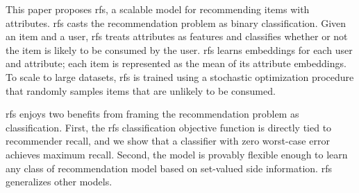 







This paper proposes \gls{rfs}, a scalable model for recommending items with
attributes. \gls{rfs} casts the recommendation problem as binary classification.
Given an item and a user, \gls{rfs} treats attributes as features and classifies
whether or not the item is likely to be consumed by the user. \gls{rfs} learns
embeddings for each user and attribute; each item is represented as the mean of
its attribute embeddings. To scale to large datasets, \gls{rfs} is trained using
a stochastic optimization procedure that randomly samples items that are
unlikely to be consumed.

\gls{rfs} enjoys two benefits from framing the recommendation problem as
classification. First, the \gls{rfs} classification objective function is
directly tied to recommender recall, and we show that a classifier with zero
worst-case error achieves maximum recall. Second, the model is provably flexible
enough to learn any class of recommendation model based on set-valued side
information. \gls{rfs} generalizes other models.

